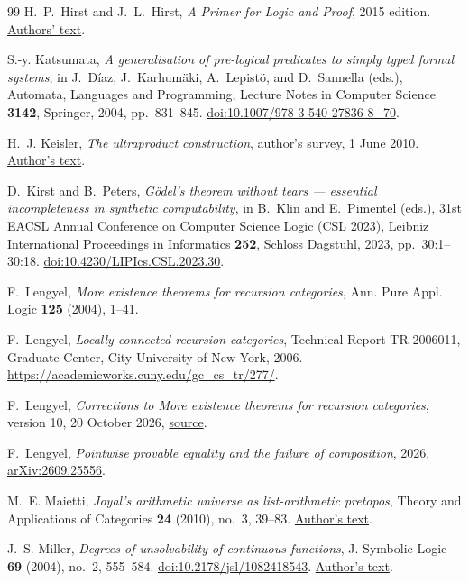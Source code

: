 \begin{thebibliography}{99}
H.~P.~Hirst and J.~L.~Hirst, \emph{A Primer for Logic and Proof},
2015 edition.
\href{https://www.appstate.edu/~hirstjl/primer/hirst.pdf}{Authors' text}.

S.-y. Katsumata,
\emph{A generalisation of pre-logical predicates to simply typed formal systems},
in J.~D\'iaz, J.~Karhum\"aki, A.~Lepist\"o, and D.~Sannella (eds.),
Automata, Languages and Programming, Lecture Notes in Computer Science
\textbf{3142}, Springer, 2004, pp.~831--845.
\href{https://doi.org/10.1007/978-3-540-27836-8_70}{doi:10.1007/978-3-540-27836-8\_70}.

H.~J. Keisler, \emph{The ultraproduct construction},
author's survey, 1 June 2010.
\href{https://people.math.wisc.edu/~hkeisler/ultraproducts-web-final.pdf}{Author's text}.

D.~Kirst and B.~Peters, \emph{G\"odel's theorem without tears ---
essential incompleteness in synthetic computability},
in B.~Klin and E.~Pimentel (eds.), 31st EACSL Annual Conference on
Computer Science Logic (CSL 2023), Leibniz International Proceedings
in Informatics \textbf{252}, Schloss Dagstuhl, 2023, pp.~30:1--30:18.
\href{https://doi.org/10.4230/LIPIcs.CSL.2023.30}{doi:10.4230/LIPIcs.CSL.2023.30}.

F.~Lengyel, \emph{More existence theorems for recursion categories},
Ann. Pure Appl. Logic \textbf{125} (2004), 1--41.

F.~Lengyel, \emph{Locally connected recursion categories},
Technical Report TR-2006011, Graduate Center, City University of New York,
2006. \url{https://academicworks.cuny.edu/gc_cs_tr/277/}.

F.~Lengyel, \emph{Corrections to More existence theorems for recursion
categories}, version 10, 20 October 2026,
\href{https://github.com/flengyel/errata/blob/5555e4fa1da7b8e3a0836dd1fbf1ca385cacd03b/lengyel2004/lengyel2004_repairs_v10.tex}{source}.

F.~Lengyel, \emph{Pointwise provable equality and the failure of
composition}, 2026,
\href{https://arxiv.org/abs/2609.25556}{arXiv:2609.25556}.

M.~E. Maietti, \emph{Joyal's arithmetic universe as list-arithmetic pretopos},
Theory and Applications of Categories \textbf{24} (2010),
no.~3, 39--83.
\href{https://www.math.unipd.it/~maietti/papers/jartacrev.pdf}{Author's text}.

J.~S. Miller, \emph{Degrees of unsolvability of continuous functions},
J. Symbolic Logic \textbf{69} (2004), no.~2, 555--584.
\href{https://doi.org/10.2178/jsl/1082418543}{doi:10.2178/jsl/1082418543}.
\href{https://people.math.wisc.edu/~jsmiller8/Papers/continuous.pdf}{Author's text}.


\end{thebibliography}
